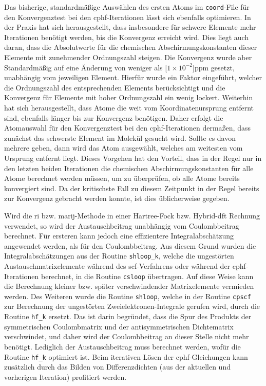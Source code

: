 \bigskip
Das bisherige, standardmäßige Auswählen des ersten Atoms im \texttt{coord}-File für den Konvergenztest bei den \ac{cphf}-Iterationen lässt sich ebenfalls optimieren. In der Praxis hat sich herausgestellt, dass insbesondere für schwere Elemente mehr Iterationen benötigt werden, bis die Konvergenz erreicht wird. Dies liegt auch daran, dass die Absolutwerte für die chemischen Abschirmungskonstanten dieser Elemente mit zunehmender Ordnungszahl steigen. Die Konvergenz wurde aber Standardmäßig auf eine Änderung von weniger als \unit[$1\times 10^{-2}$]{ppm} gesetzt, unabhängig vom jeweiligen Element. Hierfür wurde ein Faktor eingeführt, welcher die Ordnungszahl des entsprechenden Elements berücksichtigt und die Konvergenz für Elemente mit hoher Ordnungszahl ein wenig lockert. Weiterhin hat sich herausgestellt, dass Atome die weit vom Koordinatenursprung entfernt sind, ebenfalls länger bis zur Konvergenz benötigen. Daher erfolgt die Atomauswahl für den Konvergenztest bei den \ac{cphf}-Iterationen dermaßen, dass zunächst das schwerste Element im Molekül gesucht wird. Sollte es davon mehrere geben, dann wird das Atom ausgewählt, welches am weitesten vom Ursprung entfernt liegt. Dieses Vorgehen hat den Vorteil, dass in der Regel nur in den letzten beiden Iterationen die chemischen Abschirmungskonstanten für alle Atome berechnet werden müssen, um zu überprüfen, ob alle Atome bereits konvergiert sind. Da der kritischste Fall zu diesem Zeitpunkt in der Regel bereits zur Konvergenz gebracht werden konnte, ist dies üblicherweise gegeben.

\bigskip
Wird die \ac{ri} bzw. \ac{marij}-Methode in einer Hartree-Fock bzw. Hybrid-\ac{dft} Rechnung verwendet, so wird der Austauschbeitrag unabhängig vom Coulombbeitrag berechnet. Für ersteren kann jedoch eine effizientere Integralabschätzung\supercite{ochsenfeld1998linear} angewendet werden, als für den Coulombbeitrag. Aus diesem Grund wurden die Integralabschätzungen aus der Routine \texttt{shloop\_k}, welche die ungestörten Austauschmatrixelemente während des \ac{scf}-Verfahrens oder während der \ac{cphf}-Iterationen berechnet, in die Routine \texttt{csloop} übertragen. Auf diese Weise kann die Berechnung kleiner bzw. später verschwindender Matrixelemente vermieden werden. Des Weiteren wurde die Routine \texttt{shloop}, welche in der Routine \texttt{cpscf} zur Berechnung der ungestörten Zweielektronen-Integrale gerufen wird, durch die Routine \texttt{hf\_k} ersetzt. Das ist darin begründet, dass die Spur des Produkts der symmetrischen Coulombmatrix und der antisymmetrischen Dichtematrix verschwindet, und daher wird der Coulombbeitrag an dieser Stelle nicht mehr benötigt. Lediglich der Austauschbeitrag muss berechnet werden, wofür die Routine \texttt{hf\_k} optimiert ist. Beim iterativen Lösen der \ac{cphf}-Gleichungen kann zusätzlich durch das Bilden von Differenzdichten (aus der aktuellen und vorherigen Iteration) profitiert werden. 

